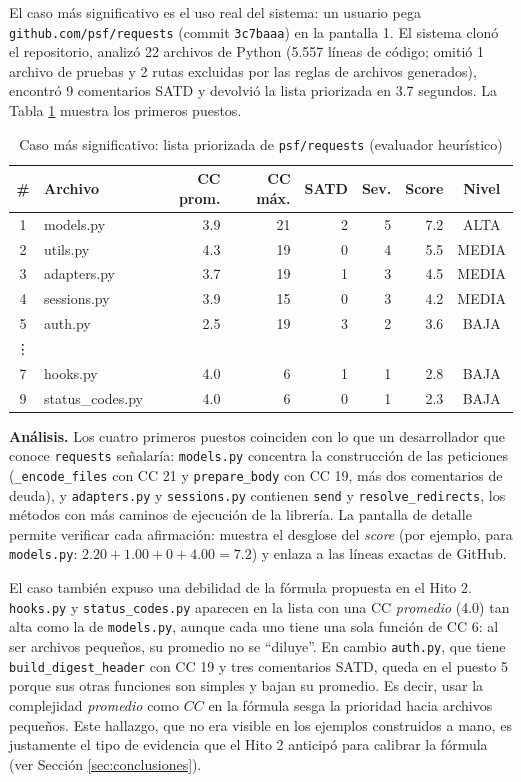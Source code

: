 El caso más significativo es el uso real del sistema: un usuario pega \texttt{github.com/psf/requests} (commit \texttt{3c7baaa}) en la pantalla 1. El sistema clonó el repositorio, analizó 22 archivos de Python (5.557 líneas de código; omitió 1 archivo de pruebas y 2 rutas excluidas por las reglas de archivos generados), encontró 9 comentarios SATD y devolvió la lista priorizada en 3.7 segundos. La Tabla \ref{tab:requests} muestra los primeros puestos.

\begin{table}[H]
\centering
\caption{Caso más significativo: lista priorizada de \texttt{psf/requests} (evaluador heurístico)}
\label{tab:requests}
\small
\begin{tabular}{c p{} r r r r r c}
\toprule
\textbf{\#} & \textbf{Archivo} & \textbf{CC prom.} & \textbf{CC máx.} & \textbf{SATD} & \textbf{Sev.} & \textbf{Score} & \textbf{Nivel} \\
\midrule
1 & models.py & 3.9 & 21 & 2 & 5 & 7.2 & ALTA \\
2 & utils.py & 4.3 & 19 & 0 & 4 & 5.5 & MEDIA \\
3 & adapters.py & 3.7 & 19 & 1 & 3 & 4.5 & MEDIA \\
4 & sessions.py & 3.9 & 15 & 0 & 3 & 4.2 & MEDIA \\
5 & auth.py & 2.5 & 19 & 3 & 2 & 3.6 & BAJA \\
\vdots & & & & & & & \\
7 & hooks.py & 4.0 & 6 & 1 & 1 & 2.8 & BAJA \\
9 & status\_codes.py & 4.0 & 6 & 0 & 1 & 2.3 & BAJA \\
\bottomrule
\end{tabular}
\end{table}

\textbf{Análisis.} Los cuatro primeros puestos coinciden con lo que un desarrollador que conoce \texttt{requests} señalaría: \texttt{models.py} concentra la construcción de las peticiones (\texttt{\_encode\_files} con CC 21 y \texttt{prepare\_body} con CC 19, más dos comentarios de deuda), y \texttt{adapters.py} y \texttt{sessions.py} contienen \texttt{send} y \texttt{resolve\_redirects}, los métodos con más caminos de ejecución de la librería. La pantalla de detalle permite verificar cada afirmación: muestra el desglose del \textit{score} (por ejemplo, para \texttt{models.py}: $2.20 + 1.00 + 0 + 4.00 = 7.2$) y enlaza a las líneas exactas de GitHub.

El caso también expuso una debilidad de la fórmula propuesta en el Hito 2. \texttt{hooks.py} y \texttt{status\_codes.py} aparecen en la lista con una CC \emph{promedio} (4.0) tan alta como la de \texttt{models.py}, aunque cada uno tiene una sola función de CC 6: al ser archivos pequeños, su promedio no se ``diluye''. En cambio \texttt{auth.py}, que tiene \texttt{build\_digest\_header} con CC 19 y tres comentarios SATD, queda en el puesto 5 porque sus otras funciones son simples y bajan su promedio. Es decir, usar la complejidad \emph{promedio} como $CC$ en la fórmula sesga la prioridad hacia archivos pequeños. Este hallazgo, que no era visible en los ejemplos construidos a mano, es justamente el tipo de evidencia que el Hito 2 anticipó para calibrar la fórmula (ver Sección \ref{sec:conclusiones}).

